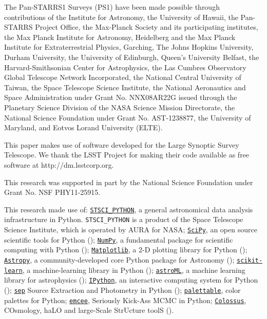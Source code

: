 \documentclass[a4paper,fleqn,usenatbib]{mnras}
\begin{document}
  The Pan-STARRS1 Surveys (PS1) have been made possible through contributions of the 
  Institute for Astronomy, the University of Hawaii, the Pan-STARRS Project Office, 
  the Max-Planck Society and its participating institutes, the Max Planck Institute 
  for Astronomy, Heidelberg and the Max Planck Institute for Extraterrestrial Physics, 
  Garching, The Johns Hopkins University, Durham University, the University of Edinburgh, 
  Queen's University Belfast, the Harvard-Smithsonian Center for Astrophysics, the Las 
  Cumbres Observatory Global Telescope Network Incorporated, the National Central 
  University of Taiwan, the Space Telescope Science Institute, the National Aeronautics 
  and Space Administration under Grant No. NNX08AR22G issued through the Planetary 
  Science Division of the NASA Science Mission Directorate, the National Science 
  Foundation under Grant No. AST-1238877, the University of Maryland, and Eotvos 
  Lorand University (ELTE).
  
  This paper makes use of software developed for the Large Synoptic Survey 
  Telescope. We thank the LSST Project for making their code available as free 
  software at http://dm.lsstcorp.org.
 
  This research was supported in part by the National Science Foundation under Grant 
  No. NSF PHY11-25915. 
  
  This research made use of:
  \href{http://www.stsci.edu/institute/software_hardware/pyraf/stsci\_python}{\texttt{STSCI\_PYTHON}},
      a general astronomical data analysis infrastructure in Python. 
      \texttt{STSCI\_PYTHON} is a product of the Space Telescope Science Institute, 
      which is operated by AURA for NASA;
  \href{http://www.scipy.org/}{\texttt{SciPy}},
      an open source scientific tools for Python (\citealt{SciPy});
  \href{http://www.numpy.org/}{\texttt{NumPy}}, 
      a fundamental package for scientific computing with Python (\citealt{NumPy});
  \href{http://matplotlib.org/}{\texttt{Matplotlib}}, 
      a 2-D plotting library for Python (\citealt{Matplotlib});
  \href{http://www.astropy.org/}{\texttt{Astropy}}, a community-developed 
      core Python package for Astronomy (\citealt{AstroPy}); 
  \href{http://scikit-learn.org/stable/index.html}{\texttt{scikit-learn}},
      a machine-learning library in Python (\citealt{scikit-learn}); 
  \href{http://www.astroml.org/}{\texttt{astroML}}, 
      a machine learning library for astrophysics (\citealt{astroML});
  \href{https://ipython.org}{\texttt{IPython}}, 
      an interactive computing system for Python (\citealt{IPython});
  \href{https://github.com/kbarbary/sep}{\texttt{sep}} 
      Source Extraction and Photometry in Python (\citealt{PythonSEP});
  \href{https://jiffyclub.github.io/palettable/}{\texttt{palettable}},
      color palettes for Python;
  \href{http://dan.iel.fm/emcee/current/}{\texttt{emcee}}, 
      Seriously Kick-Ass MCMC in Python;
  \href{http://bdiemer.bitbucket.org/}{\texttt{Colossus}}, 
      COsmology, haLO and large-Scale StrUcture toolS (\citealt{Colossus}).
\end{document}
